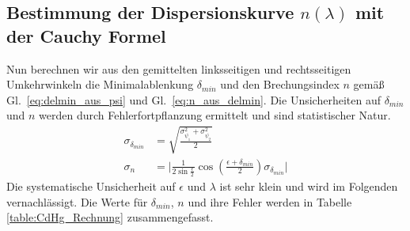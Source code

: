 \documentclass[12pt,a4paper]{article}
\begin{document}
\subsection{Bestimmung der Dispersionskurve $n(\lambda)$ mit der Cauchy Formel}
Nun berechnen wir aus den gemittelten linksseitigen und rechtsseitigen Umkehrwinkeln die Minimalablenkung $\delta_{min}$ und den Brechungsindex $n$ gemäß Gl.~\eqref{eq:delmin_aus_psi} und Gl.~\eqref{eq:n_aus_delmin}. Die Unsicherheiten auf $\delta_{min}$ und $n$ werden durch Fehlerfortpflanzung ermittelt und sind statistischer Natur.
\begin{align}
\sigma_{\delta_{min}}&=\sqrt{\frac{\sigma_{\overline{\psi_1}}^2+\sigma_{\overline{\psi_2}}^2}{2}}\\
\sigma_n&=\Big|\frac{1}{2\sin{\frac{\epsilon}{2}}}\cos{\left(\frac{\epsilon+\delta_{min}}{2}\right)}\sigma_{\delta_{min}}\Big|
\end{align}
Die systematische Unsicherheit auf $\epsilon$ und $\lambda$ ist sehr klein und wird im Folgenden vernachlässigt. Die Werte für  $\delta_{min}$, $n$ und ihre Fehler werden in Tabelle \ref{table:CdHg_Rechnung} zusammengefasst.\\
\end{document}
